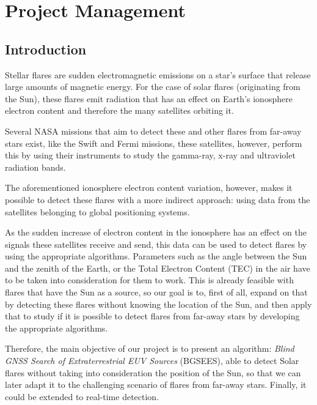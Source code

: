 \chapter{Project Management}


\section{Introduction}

Stellar flares are sudden electromagnetic emissions on a star's surface that release large amounts of magnetic energy. For the case of solar flares (originating from the Sun), these flares emit radiation that has an effect on Earth’s ionosphere electron content and therefore the many satellites orbiting it. \cite{hernandez2012gnss}

Several NASA missions that aim to detect these and other flares from far-away stars exist, like the Swift and Fermi missions, these satellites, however, perform this by using their instruments to study the gamma-ray, x-ray and ultraviolet radiation bands. \cite{gehrels2013gamma}

The aforementioned ionosphere electron content variation, however, makes it possible to detect these flares with a more indirect approach: using data from the satellites belonging to global positioning systems.

As the sudden increase of electron content in the ionosphere has an effect on the signals these satellites receive and send, this data can be used to detect flares by using the appropriate algorithms. Parameters such as the angle between the Sun and the zenith of the Earth, or the Total Electron Content (TEC) in the air have to be taken into consideration for them to work. 
This is already feasible with flares that have the Sun as a source, so our goal is to, first of all, expand on that by detecting these flares without knowing the location of the Sun, and then apply that to study if it is possible to detect flares from far-away stars by developing the appropriate algorithms.

Therefore, the main objective of our project is to present an algorithm: \textit{Blind GNSS Search of Extraterrestrial EUV Sources} (BGSEES), able to detect Solar flares without taking into consideration the position of the Sun, so that we can later adapt it to the challenging scenario of flares from far-away stars. Finally, it could be extended to real-time detection.

